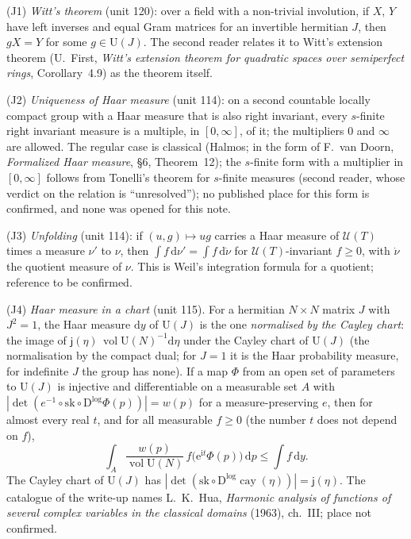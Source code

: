 \documentclass[11pt,a4paper]{article}
\theoremstyle{plainx}
\theoremstyle{uprightx}
\newcommand{\dd}{\mathrm{d}}
\newcommand{\UT}[1]{\mathcal{U}(#1)}
\newcommand{\vol}{\operatorname{vol}}
\newcommand{\volU}[1]{\vol\mathrm{U}(#1)}
\newcommand{\Inp}[1]{\textup{(#1)}}
\newcommand{\cayd}[1]{\mathsf{j}(#1)}
\begin{document}
\Inp{J1} \emph{Witt's theorem} (unit 120): over a field with a non-trivial involution, if $X$, $Y$ have left
inverses and equal Gram matrices for an invertible hermitian $J$, then $gX=Y$ for some $g\in\mathrm{U}(J)$. The
second reader relates it to Witt's extension theorem (U.~First, \emph{Witt's extension theorem for quadratic spaces
over semiperfect rings}, Corollary~4.9) as the theorem itself.

\Inp{J2} \emph{Uniqueness of Haar measure} (unit 114): on a second countable locally compact group with a Haar
measure that is also right invariant, every $s$-finite right invariant measure is a multiple, in $[0,\infty]$, of
it; the multipliers $0$ and $\infty$ are allowed. The regular case is classical (Halmos; in the form of F.~van
Doorn, \emph{Formalized Haar measure}, \S6, Theorem~12); the $s$-finite form with a multiplier in $[0,\infty]$
follows from Tonelli's theorem for $s$-finite measures (second reader, whose verdict on the relation is
``unresolved''); no published place for this form is confirmed, and none was opened for this note.

\Inp{J3} \emph{Unfolding} (unit 114): if $(u,g)\mapsto ug$ carries a Haar measure of $\UT{T}$ times a measure $\nu'$
to $\nu$, then $\int f\,\dd\nu'=\int f\,\dd\dot\nu$ for $\UT{T}$-invariant $f\ge0$, with $\dot\nu$ the quotient
measure of $\nu$. This is Weil's integration formula for a quotient; reference to be confirmed.

\Inp{J4} \emph{Haar measure in a chart} (unit 115). For a hermitian $N\times N$ matrix $J$ with $J^2=1$, the Haar
measure $\dd y$ of $\mathrm{U}(J)$ is the one \emph{normalised by the Cayley chart}: the image of
$\cayd{\eta}\,\volU{N}^{-1}\dd\eta$ under the Cayley chart of $\mathrm{U}(J)$ (the normalisation by the compact dual;
for $J=1$ it is the Haar probability measure, for indefinite $J$ the group has none). If a map $\Phi$ from an open
set of parameters to $\mathrm{U}(J)$ is injective and differentiable on a measurable set $A$ with
$|\det(e^{-1}\circ\mathrm{sk}\circ\mathrm{D}^{\log}\Phi(p))|=w(p)$ for a measure-preserving $e$, then for almost
every real $t$, and for all measurable $f\ge0$ (the number $t$ does not depend on $f$),
\[\int_A\frac{w(p)}{\volU{N}}\,f\bigl(\mathrm{e}^{\mathrm{i}t}\Phi(p)\bigr)\,\dd p\le\int f\,\dd y.\]
The Cayley chart of $\mathrm{U}(J)$ has
$|\det(\mathrm{sk}\circ\mathrm{D}^{\log}\operatorname{cay}(\eta))|=\cayd{\eta}$. The catalogue of the write-up names
L.~K.~Hua, \emph{Harmonic analysis of functions of several complex variables in the classical domains} (1963),
ch.~III; place not confirmed.
\end{document}
